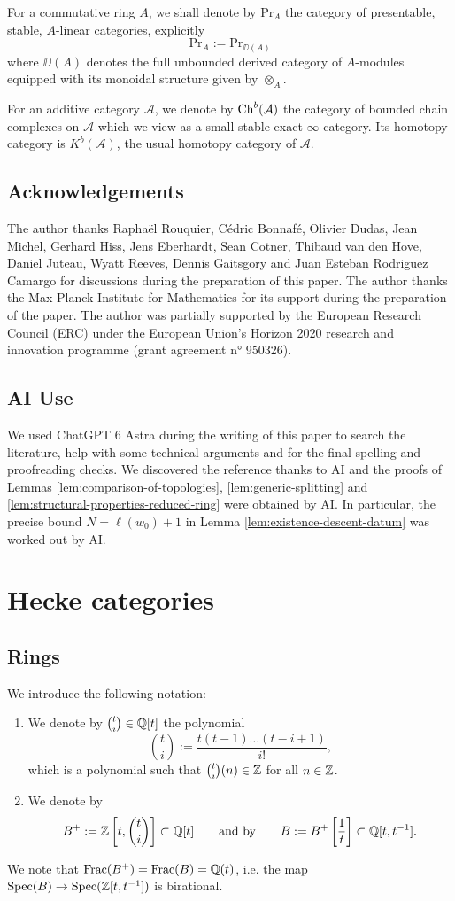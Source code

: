 \documentclass[a4paper, 10pt, oneside, reqno]{amsart}
\theoremstyle{plain}
\theoremstyle{definition}
\theoremstyle{remark}
\newcommand{\Prr}{\mathrm{Pr}}
\newcommand{\Frac}{\mathrm{Frac}}
\begin{document}
For a commutative ring $A$, we shall denote by $\Prr_A$ the category of presentable, stable, $A$-linear categories, explicitly 
$$\Prr_A := \Prr_{\DD(A)}$$
where $\DD(A)$ denotes the full unbounded derived category of $A$-modules equipped with its monoidal structure given by $\otimes_A$.

For an additive category $\mathcal{A}$, we denote by $\mathrm{Ch}^b(\mathcal{A})$ the category of bounded chain complexes on $\mathcal{A}$ which we view as a small stable exact $\infty$-category. Its homotopy category is $K^b(\mathcal{A})$, the usual homotopy category of $\mathcal{A}$. 

\subsection{Acknowledgements} The author thanks Raphaël Rouquier, Cédric Bonnafé, Olivier Dudas, Jean Michel, Gerhard Hiss, Jens Eberhardt, Sean Cotner, Thibaud van den Hove, Daniel Juteau, Wyatt Reeves, Dennis Gaitsgory and Juan Esteban Rodriguez Camargo for discussions during the preparation of this paper. The author thanks the Max Planck Institute for Mathematics for its support during the preparation of the paper. The author was partially supported by the European Research Council (ERC) under the European Union's Horizon 2020 research and innovation programme (grant agreement n° 950326).

\subsection{AI Use} We used ChatGPT 6 Astra during the writing of this paper to search the literature, help with some technical arguments and for the final spelling and proofreading checks. We discovered the reference \cite{CahenChabert} thanks to AI and the proofs of Lemmas \ref{lem:comparison-of-topologies}, \ref{lem:generic-splitting} and \ref{lem:structural-properties-reduced-ring} were obtained by AI. In particular, the precise bound $N = \ell(w_0) + 1$ in Lemma \ref{lem:existence-descent-datum} was worked out by AI.

\section{Hecke categories}

\subsection{Rings}\label{subsec:definition-polynomial-ring}
We introduce the following notation:
\begin{enumerate}
\item We denote by $\binom{t}{i} \in \mathbb{Q}[t]$ the polynomial 
$$\binom{t}{i} := \frac{t(t-1)\dots (t-i+1)}{i!},$$
which is a polynomial such that $\binom{t}{i}(n) \in \mathbb{Z}$ for all $n \in \mathbb{Z}$. 
\item We denote by 
$$B^+ := \mathbb{Z}\left[t, \binom{t}{i}\right] \subset \mathbb{Q}[t] \qquad \text{and by} \qquad B := B^+\left[\frac{1}{t}\right] \subset \mathbb{Q}[t,t^{-1}].$$
\end{enumerate}
We note that $\Frac(B^+) = \Frac(B) = \Q(t)$, i.e. the map $\mathrm{Spec}(B) \to \mathrm{Spec}(\mathbb{Z}[t,t^{-1}])$ is birational. 
\end{document}
